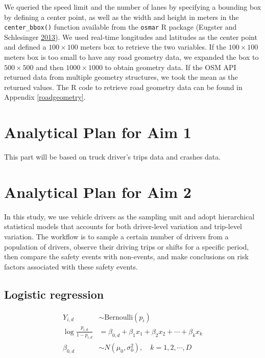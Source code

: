 \documentclass[12pt]{book}
\numberwithin{equation}{chapter}
\begin{document}
We queried the speed limit and the number of lanes by specifying a bounding box by defining a center point, as well as the width and height in meters in the \texttt{center\_bbox()} function available from the \texttt{osmar} R package (Eugster and Schlesinger \protect\hyperlink{ref-eugster2013osmar}{2013}).
We used real-time longitudes and latitudes as the center point and defined a \(100\times100\) meters box to retrieve the two variables.
If the \(100\times100\) meters box is too small to have any road geometry data, we expanded the box to \(500\times500\) and then \(1000\times1000\) to obtain geometry data.
If the OSM API returned data from multiple geometry structures, we took the mean as the returned values.
The R code to retrieve road geometry data can be found in Appendix \ref{roadgeometry}.

\hypertarget{analytical-plan-for-aim-1}{%
\section{Analytical Plan for Aim 1}\label{analytical-plan-for-aim-1}}

This part will be based on truck driver's trips data and crashes data.

\hypertarget{analytical-plan-for-aim-2}{%
\section{Analytical Plan for Aim 2}\label{analytical-plan-for-aim-2}}

In this study, we use vehicle drivers as the sampling unit and adopt hierarchical statistical models that accounts for both driver-level variation and trip-level variation. The workflow is to sample a certain number of drivers from a population of drivers, observe their driving trips or shifts for a specific period, then compare the safety events with non-events, and make conclusions on risk factors associated with these safety events.

\hypertarget{logistic-regression}{%
\subsection{Logistic regression}\label{logistic-regression}}

\begin{equation}
\begin{split}
Y_{i, d} &\sim \text{Bernoulli}(p_i)\\
\log\frac{p_{i, d}}{1-p_{i, d}} &= \beta_{0, d} + \beta_1x_1 + \beta_2x_2 + \cdots + \beta_kx_k\\
\beta_{0, d} &\sim N(\mu_0, \sigma_0^2), \quad k = 1, 2, \cdots, D
\label{eq:hierarchicallogit}
\end{split}
\end{equation}
\end{document}
